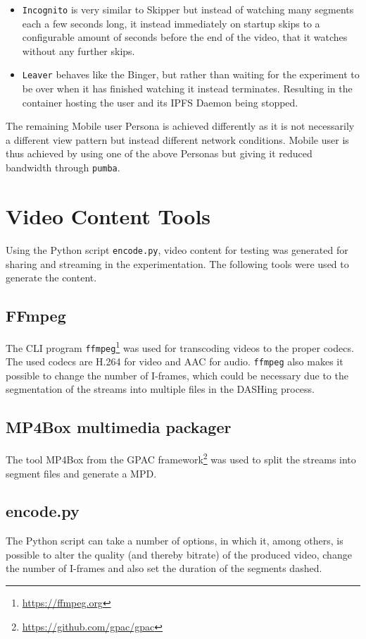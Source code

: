 \begin{itemize}
    \item \texttt{Incognito} is very similar to Skipper but instead of watching many segments each a few seconds long, it instead immediately on startup skips to a configurable amount of seconds before the end of the video, that it watches without any further skips.
    
    \item \texttt{Leaver} behaves like the Binger, but rather than waiting for the experiment to be over when it has finished watching it instead terminates. Resulting in the container hosting the user and its \ac{IPFS} Daemon being stopped.
\end{itemize}
The remaining Mobile user Persona is achieved differently as it is not necessarily a different view pattern but instead different network conditions. Mobile user is thus achieved by using one of the above Personas but giving it reduced bandwidth through \texttt{pumba}.

\section{Video Content Tools}
\label{sec:impl-video}
Using the Python script \texttt{encode.py}, video content for testing was generated for sharing and streaming in the experimentation. The following tools were used to generate the content.

\subsection{FFmpeg}
The \ac{CLI} program \texttt{ffmpeg}\footnote{\url{https://ffmpeg.org}} was used for transcoding videos to the proper codecs. The used codecs are H.264 for video and AAC for audio. 
\texttt{ffmpeg} also makes it possible to change the number of \acp{I-frame}, which could be necessary due to the segmentation of the streams into multiple files in the DASHing process.

\subsection{MP4Box multimedia packager}
The tool MP4Box from the GPAC framework\footnote{\url{https://github.com/gpac/gpac}} was used to split the streams into segment files and generate a \ac{MPD}.

\subsection{encode.py}
The Python script can take a number of options, in which it, among others, is possible to alter the quality (and thereby bitrate) of the produced video, change the number of \acp{I-frame} and also set the duration of the segments dashed.

